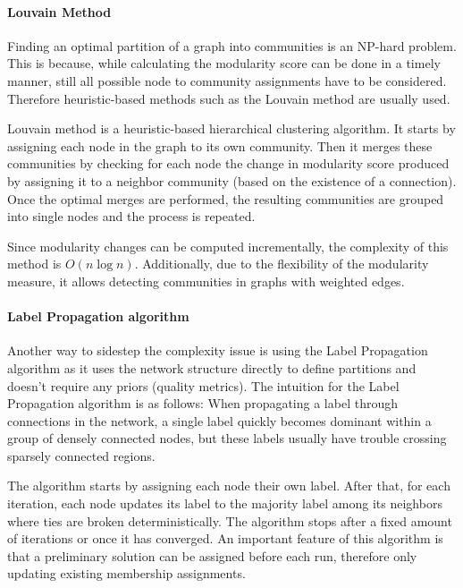 \documentclass[
acmsmall,
nonacm,
screen,
acmthm]{../../scripts/pandoc/templates/acmart}
\begin{document}
\hypertarget{louvain-method}{%
\paragraph{Louvain Method}\label{louvain-method}}

Finding an optimal partition of a graph into communities is an NP-hard
problem. This is because, while calculating the modularity score can be
done in a timely manner, still all possible node to community
assignments have to be considered. Therefore heuristic-based methods
such as the Louvain method are usually used.

Louvain method \citep{blondelFastUnfoldingCommunities2008} is a
heuristic-based hierarchical clustering algorithm. It starts by
assigning each node in the graph to its own community. Then it merges
these communities by checking for each node the change in modularity
score produced by assigning it to a neighbor community (based on the
existence of a connection). Once the optimal merges are performed, the
resulting communities are grouped into single nodes and the process is
repeated.

Since modularity changes can be computed incrementally, the complexity
of this method is \(O\left(n \log n\right)\). Additionally, due to the
flexibility of the modularity measure, it allows detecting communities
in graphs with weighted edges.

\hypertarget{label-propagation-algorithm}{%
\paragraph{Label Propagation
algorithm}\label{label-propagation-algorithm}}

Another way to sidestep the complexity issue is using the Label
Propagation algorithm as it uses the network structure directly to
define partitions and doesn't require any priors (quality metrics). The
intuition for the Label Propagation algorithm is as follows: When
propagating a label through connections in the network, a single label
quickly becomes dominant within a group of densely connected nodes, but
these labels usually have trouble crossing sparsely connected regions.

The algorithm starts by assigning each node their own label. After that,
for each iteration, each node updates its label to the majority label
among its neighbors where ties are broken deterministically. The
algorithm stops after a fixed amount of iterations or once it has
converged. An important feature of this algorithm is that a preliminary
solution can be assigned before each run, therefore only updating
existing membership assignments.
\end{document}
